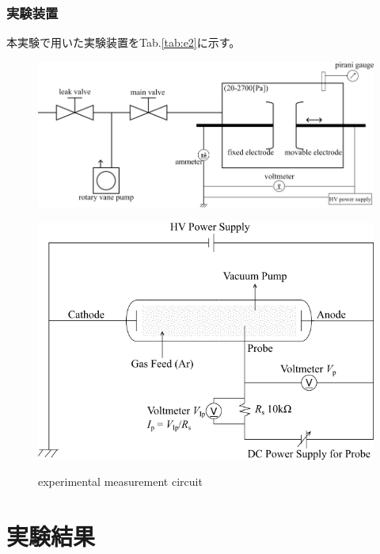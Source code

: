 \documentclass[dvipdfmx]{jsarticle}
\newcommand{\tablab}[1]{Tab.\ref{tab:#1}}%
\begin{document}
        \subsubsection*{実験装置}
            本実験で用いた実験装置を\tablab{e2}に示す。

    \begin{figure}[H]
    \begin{minipage}[b]{0.45\linewidth}
    \centering
    \includegraphics[keepaspectratio, scale=0.7]{assets/e1.png}
    \label{fig:3a}
    \end{minipage}
    \begin{minipage}[b]{0.45\linewidth}
    \centering
    \includegraphics[keepaspectratio, scale=0.7]{assets/e2.png}
    \label{fig:3b}
    \end{minipage}
    \caption{experimental measurement circuit}
    \end{figure}
  
\section{実験結果}
\end{document}

